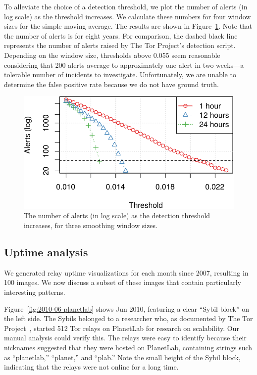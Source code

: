 To alleviate the choice of a detection threshold, we plot the number of alerts
(in log scale) as the threshold increases.  We calculate these numbers for four
window sizes for the simple moving average.  The results are shown in
Figure~\ref{fig:threshold-alarm}.  Note that the number of alerts is for eight
years.  For comparison, the dashed black line represents the number of alerts
raised by The Tor Project's detection script.  Depending on the window size,
thresholds above 0.055 seem reasonable considering that 200 alerts average to
approximately one alert in two weeks---a tolerable number of incidents to
investigate.  Unfortunately, we are unable to determine the false positive rate
because we do not have ground truth.

\begin{figure}[t]
	\centering
	\includegraphics[width=0.9\linewidth]{diagrams/threshold-alarm.pdf}
	\caption{The number of alerts (in log scale) as the detection threshold
	increases, for three smoothing window sizes.}
	\label{fig:threshold-alarm}
\end{figure}

\subsection{Uptime analysis}
\label{sec:uptime}
We generated relay uptime visualizations for each month since 2007, resulting in
100 images.  We now discuss a subset of these images that contain particularly
interesting patterns.

Figure~\ref{fig:2010-06-planetlab} shows Jun 2010, featuring a clear ``Sybil
block'' on the left side.  The Sybils belonged to a researcher who, as
documented by The Tor Project~\cite{progressreport}, started 512 Tor relays on
PlanetLab for research on scalability.  Our manual analysis could verify this.
The relays were easy to identify because their nicknames suggested that they
were hosted on PlanetLab, containing strings such as ``planetlab,'' ``planet,''
and ``plab.''  Note the small height of the Sybil block, indicating that the
relays were not online for a long time.

